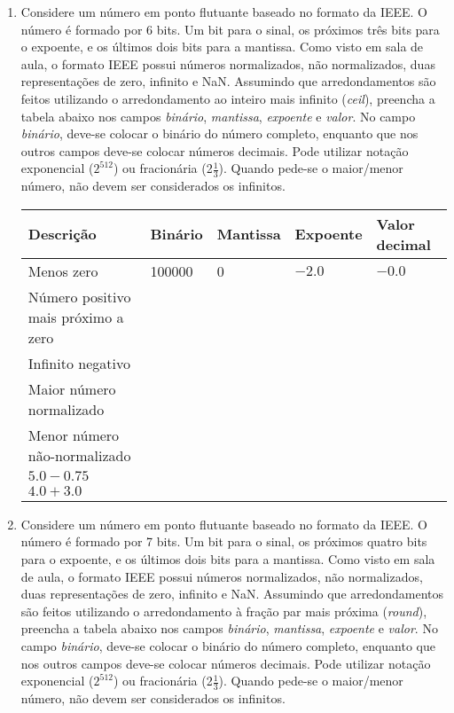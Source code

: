 \begin{enumerate}
    \item
    Considere um número em ponto flutuante baseado no formato da IEEE.
    O número é formado por 6 bits. 
    Um bit para o sinal, 
    os próximos três bits para o expoente,
    e os últimos dois bits para a mantissa.
    Como visto em sala de aula, o formato IEEE possui números normalizados,
    não normalizados, duas representações de zero, infinito e NaN.
    Assumindo que arredondamentos são feitos utilizando
    o arredondamento ao inteiro mais infinito (\textit{ceil}),
    preencha a tabela abaixo nos campos 
    \textit{binário}, \textit{mantissa}, \textit{expoente} e \textit{valor}.
    No campo \textit{binário}, deve-se colocar o binário do número completo,
    enquanto que nos outros campos deve-se colocar números decimais.
    Pode utilizar notação exponencial ($2^{512}$) ou fracionária (2$\frac{1}{3}$).
    Quando pede-se o maior/menor número, não devem ser considerados os infinitos.

    \begin{table}[H]
        \begin{tabular}{|l|l|l|l|l|}
            \hline
            \textbf{Descrição}  & 
            \textbf{Binário}    & 
            \textbf{Mantissa}   &
            \textbf{Expoente}   &
            \textbf{Valor decimal} \\\hline
            Menos zero & 100000 & 0 & $-2.0$ & $-0.0$ \\\hline
            Número positivo mais próximo a zero & & & & \\\hline
            Infinito negativo & & & & \\\hline
            Maior número normalizado & & & & \\\hline
            Menor número não-normalizado & & & & \\\hline
            $5.0 - 0.75$ & & & & \\\hline
            $4.0 + 3.0$ & & & & \\
            \hline
        \end{tabular}
    \end{table}

    \item
    Considere um número em ponto flutuante baseado no formato da IEEE.
    O número é formado por 7 bits. 
    Um bit para o sinal, 
    os próximos quatro bits para o expoente,
    e os últimos dois bits para a mantissa.
    Como visto em sala de aula, o formato IEEE possui números normalizados,
    não normalizados, duas representações de zero, infinito e NaN.
    Assumindo que arredondamentos são feitos utilizando
    o arredondamento à fração par mais próxima (\textit{round}),
    preencha a tabela abaixo nos campos 
    \textit{binário}, \textit{mantissa}, \textit{expoente} e \textit{valor}.
    No campo \textit{binário}, deve-se colocar o binário do número completo,
    enquanto que nos outros campos deve-se colocar números decimais.
    Pode utilizar notação exponencial ($2^{512}$) ou fracionária (2$\frac{1}{3}$).
    Quando pede-se o maior/menor número, não devem ser considerados os infinitos.


\end{enumerate}
